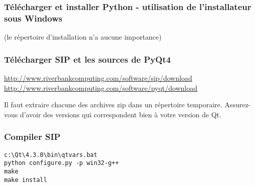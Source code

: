 \subsubsection{T\'el\'echarger et installer Python - utilisation de l'installateur sous Windows}
(le r\'epertoire d'installation n'a aucune importance)


\subsubsection{T\'el\'echarger SIP et les sources de PyQt4}
\url{http://www.riverbankcomputing.com/software/sip/download} \\
\url{http://www.riverbankcomputing.com/software/pyqt/download}

Il faut extraire chacune des archives zip dans un r\'epertoire temporaire. Assurez-vous d'avoir des versions qui correspondent bien \`a votre version de Qt.

%
%
%

\subsubsection{Compiler SIP}
\begin{verbatim}
c:\Qt\4.3.0\bin\qtvars.bat 
python configure.py -p win32-g++ 
make 
make install 
\end{verbatim}

